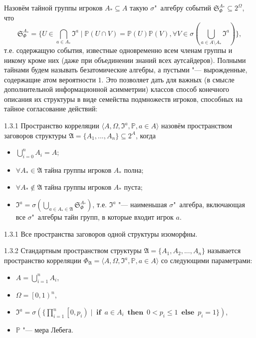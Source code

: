 Назовём тайной группы игроков $A_* \subseteq A$ такую $\sigma$"~алгебру событий $\mathfrak{S}_\Phi^{A_*} \subseteq 2^\Omega$, что
\begin{equation*}
	\mathfrak{S}_\Phi^{A_*} = \{U \in \bigcap\limits_{a \in A_*} \mathfrak{I}^a \mid \mathbb{P}(U \cap V) = \mathbb{P}(U) \mathbb{P}(V), \forall V \in \sigma(\bigcup\limits_{a \in A \setminus A_*} \mathfrak{I}^a)\},
\end{equation*}
т.е. содержащую события, известные одновременно всем членам группы и никому кроме них (даже при объединении знаний всех аутсайдеров). Полными тайнами будем называть безатомические алгебры, а пустыми "--- вырожденные, содержащие атом вероятности $1$. Это позволяет дать для важных (в смысле дополнительной информационной асимметрии) классов способ конечного описания их структуры в виде семейства подмножеств игроков, способных на тайное согласование действий:
\begin{definition}{1.3.1}
	Пространство корреляции $\langle A, \Omega, \mathfrak{I}^a, \mathbb{P}, a \in A \rangle$ назовём пространством заговоров структуры $\mathfrak{A} = \{A_1, ..., A_n\} \subseteq 2^A$, когда
	\begin{itemize}
		\item $\bigcup\limits_{i=0}^n A_i = A$;
		\item $\forall A_* \in \mathfrak{A}$ тайна группы игроков $A_*$ полна;
		\item $\forall A_* \notin \mathfrak{A}$ тайна группы игроков $A_*$ пуста;
		\item $\mathfrak{I}^a = \sigma(\bigcup\limits_{a \in A_* \in \mathfrak{A}}\mathfrak{S}_\Phi^{A_*})$, т.е. $\mathfrak{I}^a$ "--- наименьшая $\sigma$"~алгебра, включающая все $\sigma$"~алгебры тайн групп, в которые входит игрок $a$.
	\end{itemize}
\end{definition}

\begin{theorem}{1.3.1}
	Все пространства заговоров одной структуры изоморфны.
\end{theorem}

\begin{definition}{1.3.2}
	Стандартным пространством структуры $\mathfrak{A} = \{A_1, A_2, ..., A_n\}$ называется пространство корреляции $\Phi_{\mathfrak{A}} = \langle A, \Omega, \mathfrak{I}^a, \mathbb{P}, a \in A \rangle$ со следующими параметрами:
	\begin{itemize}
		\item $A = \bigcup\limits_{i=1}^n A_i$,
		\item $\Omega = \left[0, 1\right)^n$,
		\item $\mathfrak{I}^a = \sigma(\{\prod\limits_{i=1}^n\left[ 0, p_i \right) \mid \operatorname{\mathbf{if}} \: a \in A_i \: \operatorname{\mathbf{then}} \: 0 < p_i \leq 1 \: \operatorname{\mathbf{else}} \: p_i = 1 \})$,
		\item $\mathbb{P}$ "--- мера Лебега.
	\end{itemize}
\end{definition}

